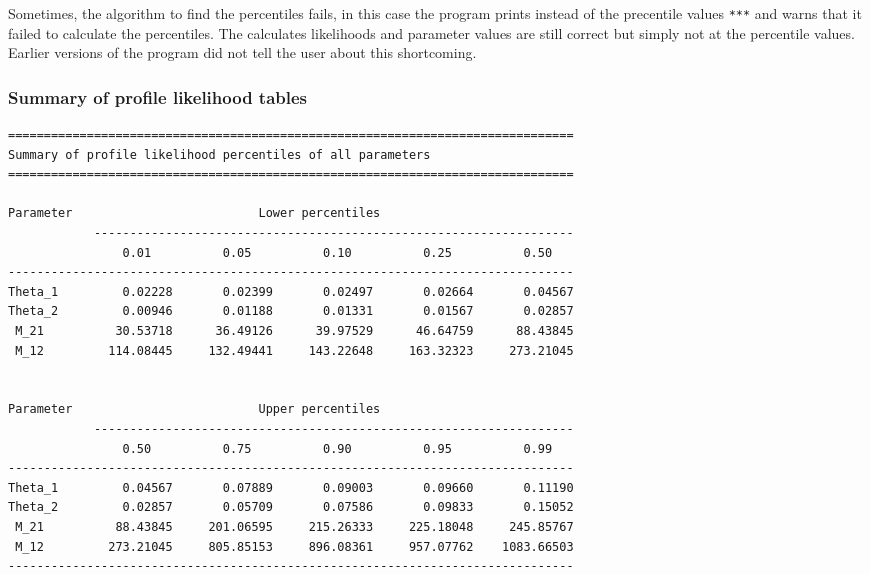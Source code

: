Sometimes, the algorithm to find the percentiles fails, in this case  the program prints instead of the precentile values \texttt{***} and warns that it failed to calculate the percentiles. The calculates likelihoods and parameter values are still correct but simply not at the percentile values. Earlier versions of the program did not tell the user about this shortcoming.
\newpage
\subsubsection{Summary of profile likelihood tables}
\begin{center}
\begin{boxedminipage}{6in}
\begin{small}
\begin{tt}
\begin{verbatim}
===============================================================================
Summary of profile likelihood percentiles of all parameters
===============================================================================

Parameter                          Lower percentiles
            -------------------------------------------------------------------
                0.01          0.05          0.10          0.25          0.50
-------------------------------------------------------------------------------
Theta_1         0.02228       0.02399       0.02497       0.02664       0.04567
Theta_2         0.00946       0.01188       0.01331       0.01567       0.02857
 M_21          30.53718      36.49126      39.97529      46.64759      88.43845
 M_12         114.08445     132.49441     143.22648     163.32323     273.21045


Parameter                          Upper percentiles
            -------------------------------------------------------------------
                0.50          0.75          0.90          0.95          0.99
-------------------------------------------------------------------------------
Theta_1         0.04567       0.07889       0.09003       0.09660       0.11190
Theta_2         0.02857       0.05709       0.07586       0.09833       0.15052
 M_21          88.43845     201.06595     215.26333     225.18048     245.85767
 M_12         273.21045     805.85153     896.08361     957.07762    1083.66503
-------------------------------------------------------------------------------
\end{verbatim}
\end{tt}
\end{small}
\end{boxedminipage}
\end{center}

